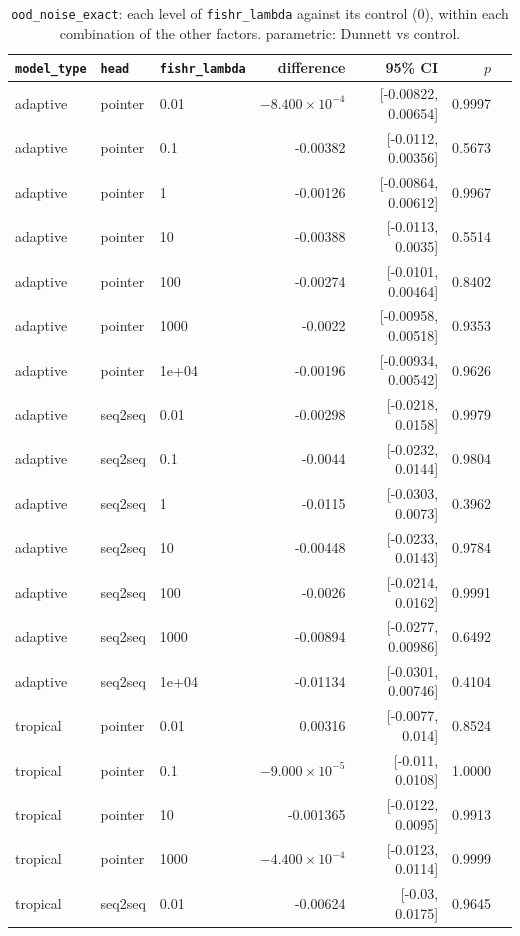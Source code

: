 \documentclass[10pt]{article}
\begin{document}
{\small
\begin{longtable}{lllrrrl}
\caption{\texttt{ood\_noise\_exact}: each level of \texttt{fishr\_lambda} against its control (0), within each combination of the other factors. parametric: Dunnett vs control.}\label{tab:control-ood_noise_exact}\\
\toprule
\texttt{model\_type} & \texttt{head} & \texttt{fishr\_lambda} & difference & 95\% CI & $p$ & \\
\midrule
\endhead
adaptive & pointer & 0.01 & $-8.400\times10^{-4}$ & [-0.00822, 0.00654] & 0.9997 & \\
adaptive & pointer & 0.1 & -0.00382 & [-0.0112, 0.00356] & 0.5673 & \\
adaptive & pointer & 1 & -0.00126 & [-0.00864, 0.00612] & 0.9967 & \\
adaptive & pointer & 10 & -0.00388 & [-0.0113, 0.0035] & 0.5514 & \\
adaptive & pointer & 100 & -0.00274 & [-0.0101, 0.00464] & 0.8402 & \\
adaptive & pointer & 1000 & -0.0022 & [-0.00958, 0.00518] & 0.9353 & \\
adaptive & pointer & 1e+04 & -0.00196 & [-0.00934, 0.00542] & 0.9626 & \\
adaptive & seq2seq & 0.01 & -0.00298 & [-0.0218, 0.0158] & 0.9979 & \\
adaptive & seq2seq & 0.1 & -0.0044 & [-0.0232, 0.0144] & 0.9804 & \\
adaptive & seq2seq & 1 & -0.0115 & [-0.0303, 0.0073] & 0.3962 & \\
adaptive & seq2seq & 10 & -0.00448 & [-0.0233, 0.0143] & 0.9784 & \\
adaptive & seq2seq & 100 & -0.0026 & [-0.0214, 0.0162] & 0.9991 & \\
adaptive & seq2seq & 1000 & -0.00894 & [-0.0277, 0.00986] & 0.6492 & \\
adaptive & seq2seq & 1e+04 & -0.01134 & [-0.0301, 0.00746] & 0.4104 & \\
tropical & pointer & 0.01 & 0.00316 & [-0.0077, 0.014] & 0.8524 & \\
tropical & pointer & 0.1 & $-9.000\times10^{-5}$ & [-0.011, 0.0108] & 1.0000 & \\
tropical & pointer & 10 & -0.001365 & [-0.0122, 0.0095] & 0.9913 & \\
tropical & pointer & 1000 & $-4.400\times10^{-4}$ & [-0.0123, 0.0114] & 0.9999 & \\
tropical & seq2seq & 0.01 & -0.00624 & [-0.03, 0.0175] & 0.9645 & \\

\end{longtable}}
\end{document}
